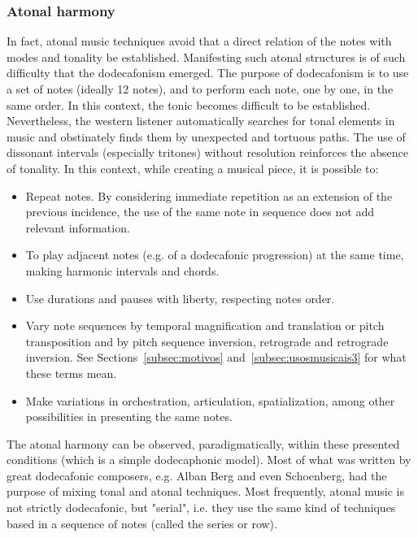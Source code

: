 \subsubsection{Atonal harmony}\label{sec:atonal}
In fact, atonal music techniques avoid that a direct relation of the notes with modes and tonality be established. Manifesting such atonal structures is of such difficulty that the dodecafonism emerged. The purpose of dodecafonism is to use a set of notes (ideally 12 notes), and to perform each note, one by one, in the same
order. In this context, the tonic becomes difficult to be established. Nevertheless, the western listener automatically searches for tonal elements in music and obstinately finds them by unexpected and tortuous paths. The use of dissonant intervals (especially tritones) without resolution reinforces the absence of tonality. In this context, while creating a musical
piece, it is possible to:
\begin{itemize}
     \item Repeat notes. By considering immediate repetition as an extension of the previous incidence, the use of the same note in sequence does not add relevant information.
     \item To play adjacent notes (e.g. of a dodecafonic progression) at the same time, making harmonic intervals and chords.
     \item Use durations and pauses with liberty, respecting notes order.
     \item Vary note sequences by temporal magnification and translation or pitch transposition and by pitch sequence inversion, retrograde and retrograde inversion. See Sections~\ref{subsec:motivos}
     and~\ref{subsec:usosmusicais3} for what these terms mean.
     \item Make variations in orchestration, articulation, spatialization, among other possibilities in presenting the same notes.
\end{itemize}

The atonal harmony can be observed, paradigmatically, within these presented conditions (which is a simple dodecaphonic model). Most of what was written by great dodecafonic composers,
e.g. Alban Berg and even Schoenberg, had the purpose of mixing tonal and atonal techniques.
Most frequently, atonal music is not strictly dodecafonic, but "serial", i.e. they use the same kind of techniques based in a sequence of notes (called the series or row).

